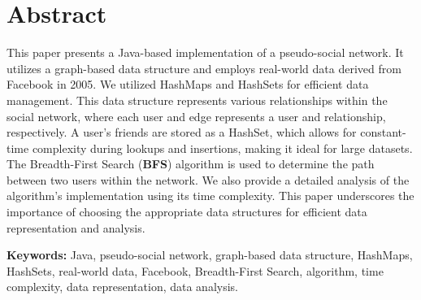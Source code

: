 
\section*{\centering \textbf{\Large{Abstract}}}
    
    \vfill
    
        This paper presents a Java-based implementation of a pseudo-social network. It utilizes a graph-based data structure and employs real-world data derived from Facebook in 2005. We utilized HashMaps and HashSets for efficient data management. This data structure represents various relationships within the social network, where each user and edge represents a user and relationship, respectively. A user's friends are stored as a HashSet, which allows for constant-time complexity during lookups and insertions, making it ideal for large datasets. The Breadth-First Search (\textbf{BFS}) algorithm is used to determine the path between two users within the network. We also provide a detailed analysis of the algorithm's implementation using its time complexity. This paper underscores the importance of choosing the appropriate data structures for efficient data representation and analysis.
    
    \vfill
    
    \textbf{Keywords:} Java, pseudo-social network, graph-based data structure, HashMaps, HashSets, real-world data, Facebook, Breadth-First Search, algorithm, time complexity, data representation, data analysis.
